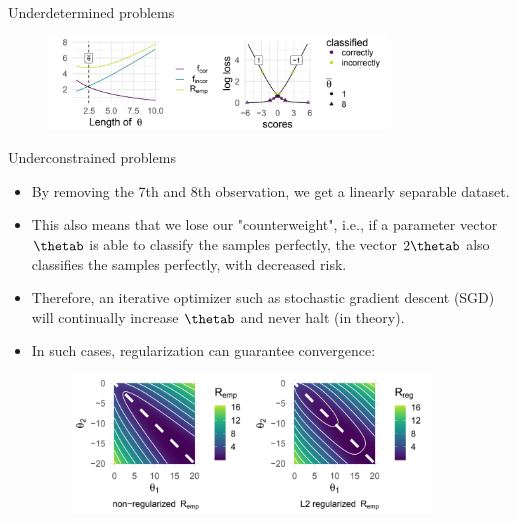 \begin{vbframe} {Underdetermined problems}
\begin{footnotesize}
\begin{figure}
\includegraphics[width=0.8\textwidth]{figure_man/undet-problem02.png}\\
\end{figure}


\end{footnotesize}
\end{vbframe}
\begin{vbframe} {Underconstrained problems}
\begin{footnotesize}
\begin{itemize}
\item By removing the 7th and 8th observation, we get a linearly separable dataset. \\
\item This also means that we lose our "counterweight", i.e., if a parameter vector $\thetab$ is able to classify the samples perfectly, the vector $2\thetab$ also classifies the samples perfectly, with decreased risk.
    \item Therefore, an iterative optimizer such as stochastic gradient descent (SGD) will continually increase $\thetab$ and never halt (in theory).
    \item In such cases, regularization can guarantee convergence: 
    
    
\begin{figure}
\includegraphics[width=0.9\textwidth]{figure_man/undercons-problem.png}\\
\end{figure}

    
\end{itemize}
\end{footnotesize}
\end{vbframe}

\endlecture

